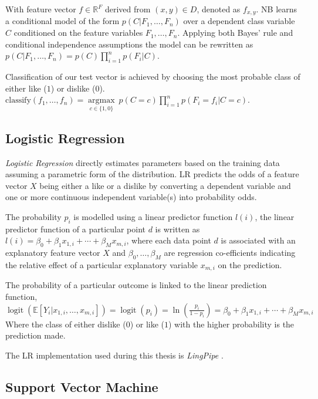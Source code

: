 With feature vector $f \in \mathbb{R}^F$ derived from $(x,y) \in D$, denoted as $f_{x,y}$. NB learns a conditional model of the form 
$p(C|F_1, \dots, F_n)$ over a dependent class variable $C$ conditioned on the feature variables $F_1, \dots, F_n$. Applying both Bayes' rule 
and conditional independence assumptions the model can be rewritten as $p(C|F_1, \dots, F_n) = p(C) \displaystyle\prod_{i=1}^n p(F_i|C)$.

Classification of our test vector is achieved by choosing the most probable class of either like ($1$) or dislike ($0$).
\\
$\mathrm{classify}(f_1,\dots,f_n) = \underset{c \in \{1,0\}}{\operatorname{argmax}} \ p(C=c) \displaystyle\prod_{i=1}^n p(F_i=f_i\vert C=c)$.

\subsection{Logistic Regression}
\label{sec:lr}

\emph{Logistic Regression} directly estimates parameters based on the training data assuming a parametric form of the distribution.
LR predicts the odds of a feature vector $X$ being either a like or a dislike by converting a dependent variable and 
one or more continuous independent variable(s) into probability odds.

The probability $p_i$ is modelled using a linear predictor function $l(i)$, the linear predictor function of a particular point $d$ 
is written as $l(i) = \beta_0 + \beta_1 x_{1,i} + \cdots + \beta_M x_{m,i}$, where each data point $d$ is associated with an explanatory 
feature vector $X$ and $\beta_0, \ldots, \beta_M$ are regression co-efficients indicating the relative effect of a particular 
explanatory variable $x_{m,i}$ on the prediction.

The probability of a particular outcome is linked to the linear prediction function, 
$\operatorname{logit}(\mathbb{E}[Y_i|x_{1,i},\ldots,x_{m,i}]) = \operatorname{logit}(p_i)=\ln\left(\frac{p_i}{1-p_i}\right) = \beta_0 + \beta_1 x_{1,i} + \cdots + \beta_M x_{m,i}$
Where the class of either dislike ($0$) or like ($1$) with the higher probability is the prediction made.

The LR implementation used during this thesis is \emph{LingPipe} \cite{lin}.

\subsection{Support Vector Machine}
\label{sec:svm}

